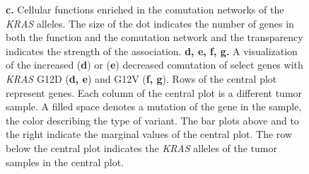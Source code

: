 \documentclass[english, 12pt, letterpaper]{article}
\newcommand{\KRAS}{\emph{KRAS}}
\begin{document}
\begin{figure}[p]
{    \textbf{c.} Cellular functions enriched in the comutation networks of the \KRAS{} alleles. The size of the dot indicates the number of genes in both the function and the comutation network and the transparency indicates the strength of the association.
    \textbf{d, e, f, g.} A visualization of the increased (\textbf{d}) or (\textbf{e}) decreased comutation of select genes with \KRAS{} G12D (\textbf{d, e}) and G12V (\textbf{f, g}). Rows of the central plot represent genes. Each column of the central plot is a different tumor sample. A filled space denotes a mutation of the gene in the sample, the color describing the type of variant. The bar plots above and to the right indicate the marginal values of the central plot. The row below the central plot indicates the \KRAS{} alleles of the tumor samples in the central plot.
}
\label{fig:coad-comutation-main}
\end{figure}
\end{document}
